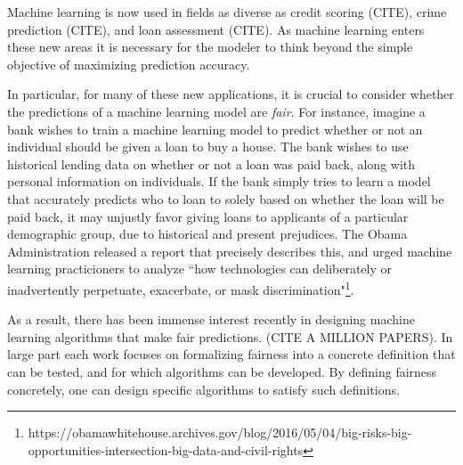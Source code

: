 Machine learning is now used in fields as diverse as credit scoring (CITE), crime prediction (CITE), and loan assessment (CITE). As machine learning enters these new areas it is necessary for the modeler to think beyond the simple objective of maximizing prediction accuracy.

In particular, for many of these new applications, it is crucial to consider whether the predictions of a machine learning model are \emph{fair}. For instance, imagine a bank wishes to train a machine learning model to predict whether or not an individual should be given a loan to buy a house. The bank wishes to use historical lending data on whether or not a loan was paid back, along with personal information on individuals. If the bank simply tries to learn a model that accurately predicts who to loan to solely based on whether the loan will be paid back, it may unjustly favor giving loans to applicants of a particular demographic group, due to historical and present prejudices. The Obama Administration released a report that precisely describes this, and urged machine learning practicioners to analyze ``how technologies can deliberately or inadvertently perpetuate, exacerbate, or mask discrimination"\footnote{https://obamawhitehouse.archives.gov/blog/2016/05/04/big-risks-big-opportunities-intersection-big-data-and-civil-rights}.

As a result, there has been immense interest recently in designing machine learning algorithms that make fair predictions. (CITE A MILLION PAPERS). In large part each work focuses on formalizing fairness into a concrete definition that can be tested, and for which algorithms can be developed. By defining fairness concretely, one can design specific algorithms to satisfy such definitions. 



